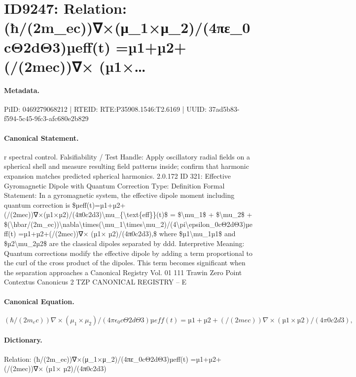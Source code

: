 \section*{ID9247: Relation: (ħ/(2m\_ec))∇×(μ\_1×μ\_2)/(4πε\_0cΘ2dΘ3)µeff(t) =µ1+µ2+(/(2mec))∇× (µ1×…}
\paragraph{Metadata.}
PiID: 0469279068212 | RTEID: RTE:P35908.1546:T2.6169 | UUID: 37ad5b83-f594-5c45-9fc3-afc680e2b829

\paragraph{Canonical Statement.}
r spectral control. Falsifiability / Test Handle: Apply oscillatory radial fields on a spherical shell and measure resulting field patterns inside; confirm that harmonic expansion matches predicted spherical harmonics. 2.0.172 ID 321: Effective Gyromagnetic Dipole with Quantum Correction Type: Definition Formal Statement: In a gyromagnetic system, the effective dipole moment including quantum correction is \$µeff(t)=µ1+µ2+(/(2mec))∇×(µ1×µ2)/(4π0c2d3)\textbackslash{}mu\_\{\textbackslash{}text\{eff\}\}(t)\$ = \$\textbackslash{}mu\_1\$ + \$\textbackslash{}mu\_2\$ + \$(\textbackslash{}hbar/(2m\_ec))\textbackslash{}nabla\textbackslash{}times(\textbackslash{}mu\_1\textbackslash{}times\textbackslash{}mu\_2)/(4\textbackslash{}pi\textbackslash{}epsilon\_0cΘ2dΘ3)µeff(t) =µ1+µ2+(/(2mec))∇× (µ1× µ2)/(4π0c2d3),\$ where \$µ1\textbackslash{}mu\_1µ1\$ and \$µ2\textbackslash{}mu\_2µ2\$ are the classical dipoles separated by ddd. Interpretive Meaning: Quantum corrections modify the effective dipole by adding a term proportional to the curl of the cross product of the dipoles. This term becomes significant when the separation approaches a Canonical Registry Vol. 01 111 Trawin Zero Point Contextus Canonicus 2 TZP CANONICAL REGISTRY – E

\paragraph{Canonical Equation.}
\[
(\hbar/(2m_ec))\nabla\times(\mu_1\times\mu_2)/(4\pi\epsilon_0cΘ2dΘ3)µeff(t) =µ1+µ2+(/(2mec))∇× (µ1× µ2)/(4π0c2d3),
\]

\paragraph{Dictionary.}
Relation: (ħ/(2m\_ec))∇×(μ\_1×μ\_2)/(4πε\_0cΘ2dΘ3)µeff(t) =µ1+µ2+(/(2mec))∇× (µ1× µ2)/(4π0c2d3)

